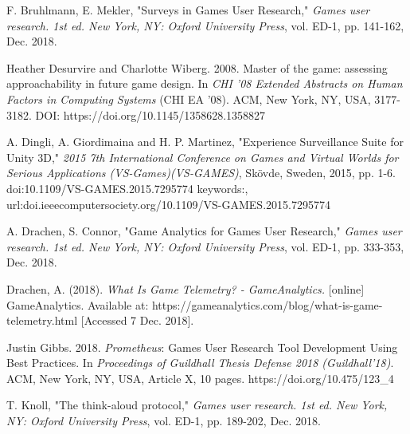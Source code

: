 \documentclass[journal]{IEEEtran}
\begin{document}
%
%
%
\begin{thebibliography}{17}

F. Bruhlmann, E. Mekler, "Surveys in Games User Research," \emph{Games user research. 1st ed. New York, NY: Oxford University Press}, vol. ED-1, pp. 141-162, Dec. 2018.

Heather Desurvire and Charlotte Wiberg. 2008. Master of the game: assessing approachability in future game design. In \emph{CHI '08 Extended Abstracts on Human Factors in Computing Systems} (CHI EA '08). ACM, New York, NY, USA, 3177-3182. DOI: https://doi.org/10.1145/1358628.1358827

A. Dingli, A. Giordimaina and H. P. Martinez, "Experience Surveillance Suite for Unity 3D," \emph{2015 7th International Conference on Games and Virtual Worlds for Serious Applications (VS-Games)(VS-GAMES)}, Skövde, Sweden, 2015, pp. 1-6.
doi:10.1109/VS-GAMES.2015.7295774 keywords:{}, url:doi.ieeecomputersociety.org/10.1109/VS-GAMES.2015.7295774

A. Drachen, S. Connor, "Game Analytics for Games User Research," \emph{Games user research. 1st ed. New York, NY: Oxford University Press}, vol. ED-1, pp. 333-353, Dec. 2018.

Drachen, A. (2018). \emph{What Is Game Telemetry? - GameAnalytics.} [online] GameAnalytics. Available at: https://gameanalytics.com/blog/what-is-game-telemetry.html [Accessed 7 Dec. 2018].

Justin Gibbs. 2018. \emph{Prometheus}: Games User Research Tool Development Using Best Practices. In \emph{Proceedings of Guildhall Thesis Defense 2018 (Guildhall’18)}. ACM, New York, NY, USA, Article X, 10 pages. https://doi.org/10.475/123\_4

T. Knoll, "The think-aloud protocol," \emph{Games user research. 1st ed. New York, NY: Oxford University Press}, vol. ED-1, pp. 189-202, Dec. 2018.


\end{thebibliography}
\end{document}
